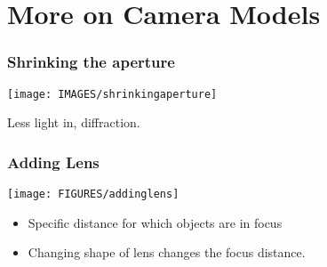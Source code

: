 \documentclass[9pt]{beamer}
\begin{document}




\section{More on Camera Models}


\begin{frame}
  \frametitle{Shrinking the aperture}
  \begin{center}
    \texttt{[image: IMAGES/shrinkingaperture]}
  \end{center}
  Less light in, diffraction. 
\end{frame}


\begin{frame}
  \frametitle{Adding Lens}
   \begin{center}
    \texttt{[image: FIGURES/addinglens]}
  \end{center}
  \begin{itemize}
  \item Specific distance for which objects are in focus
  \item Changing shape of lens changes the focus distance.
  \end{itemize}
\end{frame}
\end{document}
